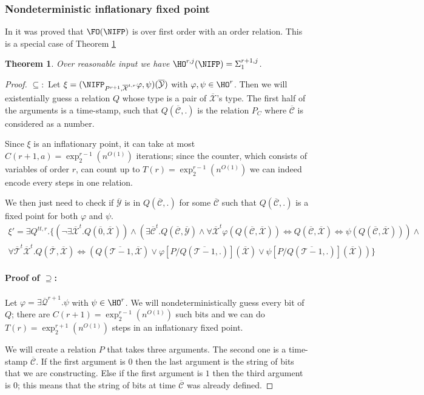 \documentclass[a4paper,12pt]{article}
\newcommand{\sss}[1]{\subsubsection{#1}}
\newtheorem{theorem}{Theorem}[section]
\theoremstyle{definition}
\renewcommand{\phi}{\varphi}
\newcommand{\hoa}[1]{\ensuremath{\HO^{#1}}}
\newcommand{\hod}[2]{\ensuremath{\HO^{#1,#2}}}
\newcommand{\hoc}[3]{\ensuremath{\Sigma^{#1,#3}_{#2}}}
\newcommand{\ex}[1]{\ensuremath{\exp_{2}^{#1}(n^{O(1)})}}
\newcommand{\mc}{\mathcal}
\newcommand{\ol}{\overline}
\newcommand{\olmc}[1]{\overline{\mathcal{#1}}}
\begin{document}
\sss{Nondeterministic inflationary fixed point}
In \cite{nfp} it was proved that $\FO(\NIFP)${} is \NP{} over first
order with an order relation. This is a special case of Theorem
\ref{tnifp}

\begin{theorem}\label{tnifp}
  Over reasonable input we have $\hod rj(\NIFP)=\hoc{r+1}1j$.
\end{theorem}
  \begin{proof}$\subseteq:$ Let $\xi=(\NIFP_{P^{r+1},\olmc
      X^{t,r}}\phi,\psi)(\olmc Y)$ with $\phi,\psi\in \hoa r$. Then we
    will existentially guess a relation $Q$ whose type is a pair of
    $\olmc X$'s type. The first half of the arguments is a time-stamp,
    such that $Q(\olmc C,.)$ is the relation $P_{C}$ where $\olmc C$
    is considered as a number.

  Since $\xi$ is an inflationary point, it can take at most
  $C(r+1,a)=\ex {r-1}$ iterations; since the counter, which consists of
  variables of order $r$, can count up to $T(r)=\ex {r-1}$ we can
  indeed encode every steps in one relation.

  We then just need to check if $\olmc Y$ is in $Q(\olmc C,.)$ for
  some $\olmc C$ such that $Q(\olmc C,.)$ is a fixed point for both
  $\phi$ and $\psi$.
\begin{eqnarray}
  \xi'=\exists Q^{tt,r}.\{(\neg \exists \olmc X^{t}.Q(\ol
  0,\olmc X)) \land
  (\exists \olmc C^{t}. Q(\olmc C,\olmc Y)\land
  \forall \olmc X^{t} \phi(Q(\olmc C, \olmc X))\Leftrightarrow Q(\olmc C, \olmc X)\Leftrightarrow
  \psi(Q(\olmc C, \olmc X))) \land\nonumber\\\forall \olmc T^{t}\olmc X^{t}.Q(\olmc
  T,\olmc X)\Leftrightarrow
  (Q(\ol {\mc T-1},\olmc X)\lor\phi[P/Q(\ol{\mc T-1},.)](\olmc X)\lor\psi[P/Q(\ol{\mc T-1},.)](\olmc X))\}
\end{eqnarray}
\paragraph{Proof of $\supseteq$:}
Let $\phi=\exists \olmc Q^{r+1}. \psi$ with $\psi\in\hoa r$. We will
nondeterministically guess every bit of $Q$; there are $C(r+1)=\ex
{r-1}$ such bits and we can do $T(r)=\ex {r+1}$ steps in an
inflationary fixed point. 

We will create a relation $P$ that takes three arguments. The second
one is a time-stamp $\olmc C$. If the first argument is 0 then the
last argument is the string of bits that we are constructing. Else if
the first argument is $1$ then the third argument is $0$; this means
that the string of bits at time $\olmc C$ was already defined.


\end{proof}
\end{document}
